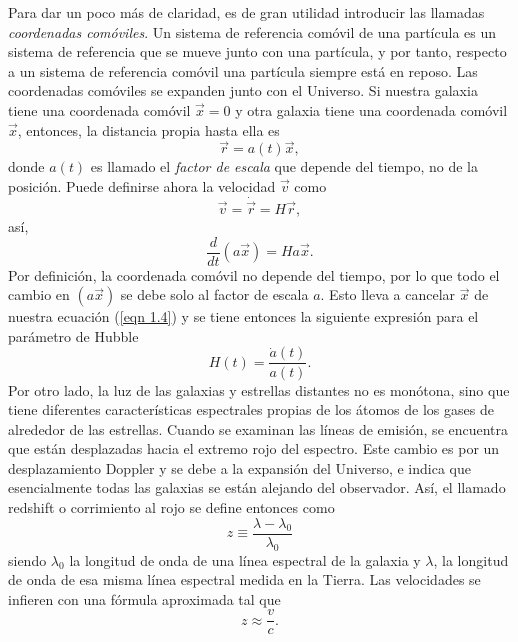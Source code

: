 \documentclass[a4paper,openright,10pt, oneside, final]{book}
\begin{document}
Para dar un poco más de claridad, es de gran utilidad introducir las llamadas \textit{coordenadas comóviles}. Un sistema de referencia comóvil de una partícula es un sistema de referencia que se mueve junto con una partícula, y por tanto, respecto a un sistema de referencia comóvil una partícula siempre está en reposo. Las coordenadas comóviles se expanden junto con el Universo. Si nuestra galaxia tiene una coordenada comóvil $\vec{x}=0$ y otra galaxia tiene una coordenada comóvil $\vec{x}$, entonces, la distancia propia hasta ella es
\begin{equation}
\vec{r} = a(t)\vec{x},\label{eqn 1.2}
\end{equation}
donde $a(t)$ es llamado el \textit{factor de escala} que depende del tiempo, no de la posición. Puede definirse ahora la velocidad $\vec{v}$ como 
\begin{equation}
\vec{v} = \dot{\vec{r}} = H\vec{r},\label{eqn 1.3}
\end{equation}
así,
\begin{equation}
\frac{d}{dt}(a\vec{x})= Ha\vec{x}.\label{eqn 1.4}
\end{equation} 
Por definición, la coordenada comóvil no depende del tiempo, por lo que todo el cambio en $(a\vec{x})$ se debe solo al factor de escala $a$. Esto lleva a cancelar $\vec{x}$ de nuestra ecuación (\ref{eqn 1.4}) y se tiene entonces la siguiente expresión para el parámetro de Hubble
\begin{equation}
H(t) = \frac{\dot{a}(t)}{a(t)}.\label{eqn 1.5}
\end{equation}
Por otro lado, la luz de las galaxias y estrellas distantes no es monótona, sino que tiene diferentes características espectrales propias de los átomos de los gases de alrededor de las estrellas. Cuando se examinan las líneas de emisión, se encuentra que están desplazadas hacia el extremo rojo del espectro. Este cambio es por un desplazamiento Doppler y se debe a la expansi\'on del Universo, e indica que esencialmente todas las galaxias se están alejando del observador. Así, el llamado redshift o corrimiento al rojo se define entonces como 
\begin{equation}
 z \equiv \frac{\lambda - \lambda_{0}}{\lambda_{0}}\label{eqn 1.6}
\end{equation}
siendo $\lambda_{0}$ la longitud de onda de una línea espectral de la galaxia y $\lambda$, la longitud de onda de esa misma línea espectral medida en la Tierra. Las velocidades se infieren con una fórmula aproximada tal que
\begin{equation*}
z \approx \frac{v}{c}.
\end{equation*}
\end{document}
